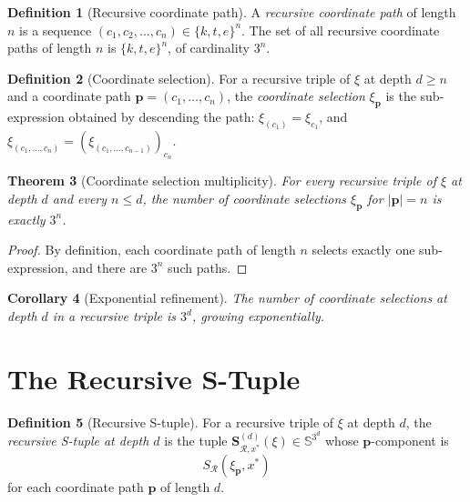 \documentclass[twocolumn,11pt,a4paper]{article}
\theoremstyle{thmstyle}
\newtheorem{theorem}{Theorem}[section]
\newtheorem{corollary}[theorem]{Corollary}
\theoremstyle{thmstyle}
\theoremstyle{definition}
\newtheorem{definition}[theorem]{Definition}
\theoremstyle{remark}
\newcommand{\Sscale}{\mathbb{S}}
\newcommand{\receiver}{\mathcal{R}}
\newcommand{\Sscalar}{S}
\begin{document}
\begin{definition}[Recursive coordinate path]
\label{def:rec-coord-path}
A \emph{recursive coordinate path} of length $n$ is a
sequence
$(c_{1}, c_{2}, \ldots, c_{n}) \in \{k, t, e\}^{n}$.
The set of all recursive coordinate paths of length
$n$ is $\{k, t, e\}^{n}$, of cardinality $3^{n}$.
\end{definition}

\begin{definition}[Coordinate selection]\label{def:coord-sel}
For a recursive triple of $\xi$ at depth $d \geq n$
and a coordinate path
$\bm{p} = (c_{1}, \ldots, c_{n})$, the
\emph{coordinate selection} $\xi_{\bm{p}}$ is the
sub-expression obtained by descending the path:
$\xi_{(c_{1})} = \xi_{c_{1}}$, and
$\xi_{(c_{1}, \ldots, c_{n})} =
(\xi_{(c_{1}, \ldots, c_{n-1})})_{c_{n}}$.
\end{definition}

\begin{theorem}[Coordinate selection multiplicity]
\label{thm:coord-mult}
For every recursive triple of $\xi$ at depth $d$
and every $n \leq d$, the number of coordinate
selections $\xi_{\bm{p}}$ for $|\bm{p}| = n$ is
exactly $3^{n}$.
\end{theorem}

\begin{proof}
By definition, each coordinate path of length $n$
selects exactly one sub-expression, and there are
$3^{n}$ such paths.
\end{proof}

\begin{corollary}[Exponential refinement]\label{cor:exp-refinement}
The number of coordinate selections at depth $d$ in
a recursive triple is $3^{d}$, growing exponentially.
\end{corollary}

\section{The Recursive S-Tuple}
\label{sec:recursive-stuple}

\begin{definition}[Recursive S-tuple]\label{def:rec-stuple}
For a recursive triple of $\xi$ at depth $d$, the
\emph{recursive S-tuple at depth $d$} is the tuple
$\bm{S}^{(d)}_{\receiver, x^{*}}(\xi) \in
\Sscale^{3^{d}}$ whose $\bm{p}$-component is
\[
\Sscalar_{\receiver}(\xi_{\bm{p}}, x^{*})
\]
for each coordinate path $\bm{p}$ of length $d$.
\end{definition}
\end{document}
